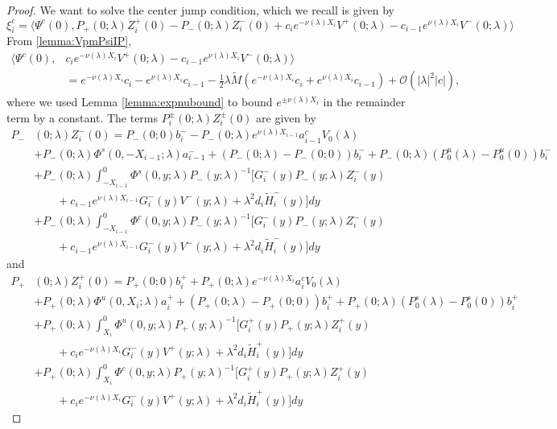 \documentclass[thesis.tex]{subfiles}
\begin{document}
\begin{lemma}
\begin{proof}
We want to solve the center jump condition, which we recall is given by
\[
\xi_i^c = 
\langle \Psi^c(0), P_+(0; \lambda) Z_i^+(0) - P_-(0; \lambda) Z_i^-(0) + c_i e^{-\nu(\lambda)X_i}V^+(0; \lambda) - c_{i-1} e^{\nu(\lambda)X_i} V^-(0; \lambda) \rangle 
\]
From \cref{lemma:VpmPsiIP},
\begin{align}\label{centerVjump}
\langle \Psi^c(0), &c_i e^{-\nu(\lambda)X_i}V^+(0; \lambda) - c_{i-1} e^{\nu(\lambda)X_i} V^-(0; \lambda) \rangle \\
&= e^{-\nu(\lambda)X_i}c_i  - e^{\nu(\lambda)X_i}c_{i-1} 
-\frac{1}{2}\lambda \tilde{M} \left( e^{-\nu(\lambda)X_i}c_i + e^{\nu(\lambda)X_i}c_{i-1}\right)+ \mathcal{O}(|\lambda|^2 |c| ),
\end{align}
where we used Lemma \ref{lemma:expnubound} to bound $e^{\pm\nu(\lambda)X_i}$ in the remainder term by a constant. The terms $P_i^\pm(0; \lambda) Z_i^\pm(0)$ are given by
\begin{align*}
P_-&(0; \lambda) Z_i^-(0) = P_-(0; 0) b_i^- - P_-(0; \lambda) e^{\nu(\lambda) X_{i-1}} a_{i-1}^c V_0(\lambda) \\
&+ P_-(0; \lambda) \Phi^s(0, -X_{i-1}; \lambda) a_{i-1}^- + (P_-(0; \lambda) - P_-(0; 0))b_i^- + P_-(0; \lambda)(P_0^u(\lambda) - P_0^u(0))b_i^- \\
&+ P_-(0; \lambda) \int_{-X_{i-1}}^0 \Phi^s(0, y; \lambda) P_-(y; \lambda)^{-1} \big[ G_i^-(y) P_-(y; \lambda) Z_i^-(y) \\
&\qquad+ c_{i-1} e^{\nu(\lambda)X_{i-1}} G_i^-(y) V^-(y; \lambda) + \lambda^2 d_i \tilde{H}_i^-(y)\big] dy \\
&+ P_-(0; \lambda) \int_{-X_{i-1}}^0 \Phi^c(0, y; \lambda) P_-(y; \lambda)^{-1} \big[ G_i^-(y) P_-(y; \lambda) Z_i^-(y) \\
&\qquad+ c_{i-1} e^{\nu(\lambda)X_{i-1}} G_i^-(y) V^-(y; \lambda) + \lambda^2 d_i \tilde{H}_i^-(y)\big] dy
\end{align*}
and
\begin{align*}
P_+&(0; \lambda) Z_i^+(0) = P_+(0; 0) b_i^+ + P_+(0; \lambda) e^{-\nu(\lambda)X_i} a_i^c V_0(\lambda) \\
&+ P_+(0; \lambda) \Phi^u(0, X_i; \lambda) a_i^+ + (P_+(0; \lambda) - P_+(0; 0)) b_i^+ + P_+(0; \lambda) (P_0^s(\lambda) - P_0^s(0)) b_i^+ \\
&+ P_+(0; \lambda) \int_{X_i}^0 \Phi^u(0, y; \lambda) P_+(y; \lambda)^{-1} \big[ G_i^+(y) P_+(y; \lambda) Z_i^+(y) \\
&\qquad+ c_i e^{-\nu(\lambda)X_i} G_i^-(y) V^+(y; \lambda) + \lambda^2 d_i \tilde{H}_i^+(y)\big] dy \\
&+ P_+(0; \lambda) \int_{X_i}^0 \Phi^c(0, y; \lambda) P_+(y; \lambda)^{-1} \big[ G_i^+(y) P_+(y; \lambda) Z_i^+(y) \\
&\qquad+ c_i e^{-\nu(\lambda)X_i} G_i^-(y) V^+(y; \lambda) + \lambda^2 d_i \tilde{H}_i^+(y)\big] dy 
\end{align*}


\end{proof}
\end{lemma}
\end{document}
